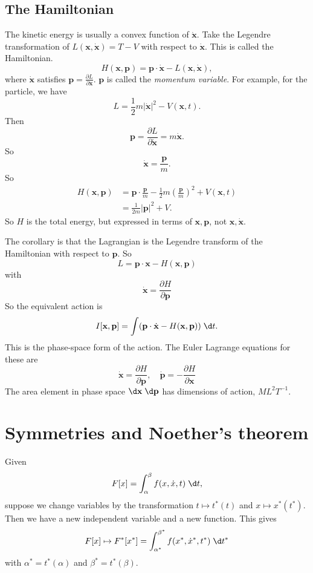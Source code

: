 \documentclass[a4paper]{article}
\begin{document}
\subsection{The Hamiltonian}
The kinetic energy is usually a convex function of $\dot{\mathbf{x}}$. Take the Legendre transformation of $L(\mathbf{x}, \dot{\mathbf{x}}) = T - V$ with respect to $\dot{\mathbf{x}}$. This is called the Hamiltonian.
\[
  H(\mathbf{x}, \mathbf{p}) = \mathbf{p}\cdot \dot{\mathbf{x}} - L(\mathbf{x}, \dot{\mathbf{x}}),
\]
where $\dot{\mathbf{x}}$ satisfies $\mathbf{p} = \frac{\partial L}{\partial \dot{\mathbf{x}}}$. $\mathbf{p}$ is called the \emph{momentum variable}. For example, for the particle, we have
\[
  L = \frac{1}{2}m|\dot{\mathbf{x}}|^2 - V(\mathbf{x}, t).
\]
Then
\[
  \mathbf{p} = \frac{\partial L}{\partial \dot{\mathbf{x}}} = m\dot{\mathbf{x}}.
\]
So
\[
  \dot{\mathbf{x}} = \frac{\mathbf{p}}{m}.
\]
So
\begin{align*}
  H(\mathbf{x}, \mathbf{p}) &= \mathbf{p}\cdot \frac{\mathbf{p}}{m} - \frac{1}{2}m\left(\frac{\mathbf{p}}{m}\right)^2 + V(\mathbf{x}, t)\\
  &= \frac{1}{2m}|\mathbf{p}|^2 + V.
\end{align*}
So $H$ is the total energy, but expressed in terms of $\mathbf{x}, \mathbf{p}$, not $\mathbf{x}, \dot{\mathbf{x}}$.

The corollary is that the Lagrangian is the Legendre transform of the Hamiltonian with respect to $\mathbf{p}$. So
\[
  L = \mathbf{p}\cdot \mathbf{x} - H(\mathbf{x}, \mathbf{p})
\]
with
\[
  \dot{\mathbf{x}} = \frac{\partial H}{\partial \mathbf{p}}
\]
So the equivalent action is
\[
  I[\mathbf{x}, \mathbf{p}] = \int (\mathbf{p}\cdot \dot{\mathbf{x}} - H(\mathbf{x}, \mathbf{p}))\;\d t.
\]
This is the phase-space form of the action. The Euler Lagrange equations for these are
\[
  \dot{\mathbf{x}} = \frac{\partial H}{\partial \mathbf{p}}, \quad \dot{\mathbf{p}} = -\frac{\partial H}{\partial \mathbf{x}}
\]
The area element in phase space $\d \mathbf{x}\; \d \mathbf{p}$  has dimensions of action, $ML^2T^{-1}$.

\section{Symmetries and Noether's theorem}
Given
\[
  F[x]= \int_\alpha^\beta f(x, \dot{x}, t)\;\d t,
\]
suppose we change variables by the transformation $t \mapsto t^*(t)$ and $x\mapsto x^*(t^*)$. Then we have a new independent variable and a new function. This gives
\[
  F[x] \mapsto F^* [x^*] = \int_{\alpha^*}^{\beta^*} f(x^*, \dot{x}^*, t^*)\;\d t^*
\]
with $\alpha^* = t^*(\alpha)$ and $\beta^* = t^*(\beta)$.
\end{document}
